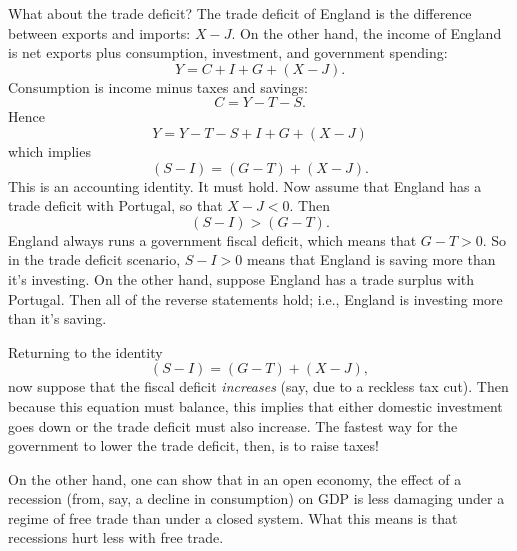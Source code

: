 \documentclass{article}
\begin{document}
What about the trade deficit? The trade deficit of England is the difference between exports and
imports: $X - J$. On the other hand, the income of England is net exports plus consumption,
investment, and government spending:
\begin{equation*}
  Y = C + I + G + (X - J).
\end{equation*}
Consumption is income minus taxes and savings:
\begin{equation*}
  C = Y - T - S.
\end{equation*}
Hence
\begin{equation*}
  Y = Y - T - S + I + G + (X - J)
\end{equation*}
which implies
\begin{equation*}
  (S - I) = (G - T) + (X - J).  
\end{equation*}
This is an accounting identity. It must hold. Now assume that England has a trade deficit with
Portugal, so that $X - J < 0$. Then
\begin{equation*}
  (S-I) > (G-T).
\end{equation*}
England always runs a government fiscal deficit, which means that $G-T > 0$. So in the trade deficit
scenario, $S - I > 0$ means that England is saving more than it's investing. On the other hand,
suppose England has a trade surplus with Portugal. Then all of the reverse statements hold; i.e.,
England is investing more than it's saving.

Returning to the identity
\begin{equation*}
  (S - I) = (G - T) + (X - J),
\end{equation*}
now suppose that the fiscal deficit \emph{increases} (say, due to a reckless tax cut). Then because
this equation must balance, this implies that either domestic investment goes down or the trade
deficit must also increase. The fastest way for the government to lower the trade deficit, then, is
to raise taxes! 

On the other hand, one can show that in an open economy, the effect of a recession (from, say, a
decline in consumption) on GDP is less damaging under a regime of free trade than under a closed
system. What this means is that recessions hurt less with free trade.
\end{document}
